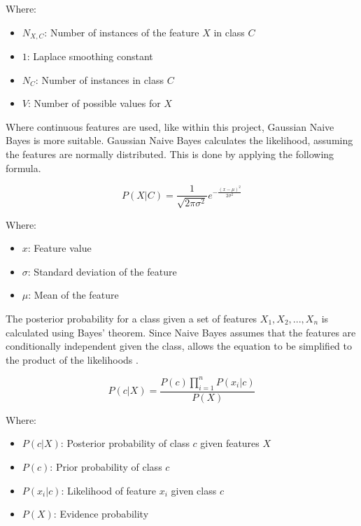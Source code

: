 Where:
\begin{itemize}
    \item $N_{X,C}$: Number of instances of the feature $X$ in class $C$
    \item $1$: Laplace smoothing constant
    \item $N_C$: Number of instances in class $C$
    \item $V$: Number of possible values for $X$
\end{itemize}


Where continuous features are used, like within this project, Gaussian Naive Bayes is more suitable. Gaussian Naive Bayes calculates the likelihood, assuming the features are normally distributed. This is done by applying the following formula.

\begin{equation}
    \label{eq:gaussian}
    P(X | C) = \frac{1}{\sqrt{2\pi\sigma^2}} e^{-\frac{(x - \mu)^2}{2\sigma^2}}
\end{equation}

Where:
\begin{itemize}
    \item $x$: Feature value
    \item $\sigma$: Standard deviation of the feature
    \item $\mu$: Mean of the feature
\end{itemize}

The posterior probability for a class given a set of features $X_1, X_2,..., X_n $ is calculated using Bayes' theorem. Since Naive Bayes assumes that the features are conditionally independent given the class, allows the equation to be simplified to the product of the likelihoods \cite{lowdNaiveBayesModels2005}.

\begin{equation}
    \label{eq:posterior}
    P(c | X) = \frac {P(c) \prod_{i=1}^{n} P(x_i | c)} {P(X)}
\end{equation}

Where:
\begin{itemize}
    \item $P(c | X)$: Posterior probability of class $c$ given features $X$
    \item $P(c)$: Prior probability of class $c$
    \item $P(x_i | c)$: Likelihood of feature $x_i$ given class $c$
    \item $P(X)$: Evidence probability
\end{itemize}

